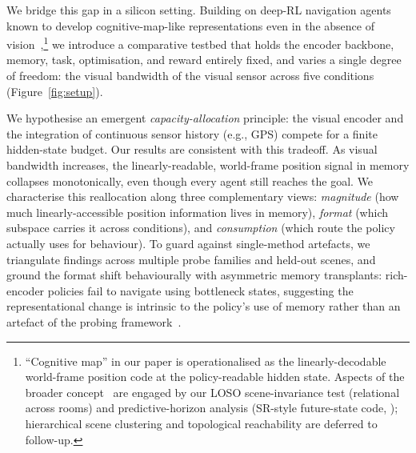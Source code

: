 \documentclass{article}
\begin{document}
We bridge this gap in a silicon setting. Building on deep-RL navigation agents known to develop cognitive-map-like representations even in the absence of vision~\citep{wijmans2023emergence,banino2018grid,cueva2018grid},\footnote{\small ``Cognitive map'' in our paper is operationalised as the linearly-decodable world-frame position code at the policy-readable hidden state. Aspects of the broader concept~\citep{epstein2017cognitive} are engaged by our LOSO scene-invariance test (relational across rooms) and predictive-horizon analysis (SR-style future-state code, \citealt{stachenfeld2017predictive}); hierarchical scene clustering and topological reachability are deferred to follow-up.} we introduce a comparative testbed that holds the encoder backbone, memory, task, optimisation, and reward entirely fixed, and varies a single degree of freedom: the visual bandwidth of the visual sensor across five conditions (Figure~\ref{fig:setup}).

We hypothesise an emergent \emph{capacity-allocation} principle: the visual encoder and the integration of continuous sensor history (e.g., GPS) compete for a finite hidden-state budget. Our results are consistent with this tradeoff. As visual bandwidth increases, the linearly-readable, world-frame position signal in memory collapses monotonically, even though every agent still reaches the goal. We characterise this reallocation along three complementary views: \emph{magnitude} (how much linearly-accessible position information lives in memory), \emph{format} (which subspace carries it across conditions), and \emph{consumption} (which route the policy actually uses for behaviour). To guard against single-method artefacts, we triangulate findings across multiple probe families and held-out scenes, and ground the format shift behaviourally with asymmetric memory transplants: rich-encoder policies fail to navigate using bottleneck states, suggesting the representational change is intrinsic to the policy's use of memory rather than an artefact of the probing framework~\citep{orozco2025emergentopenvla}.
\end{document}
